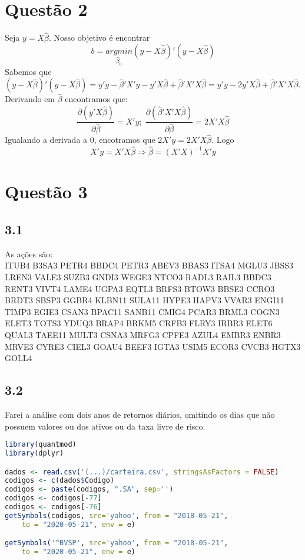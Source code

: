 \documentclass[12pt]{article}
\begin{document}
\section*{Questão 2}
Seja $y=X\hat{\beta}$. Nosso objetivo é encontrar
\begin{equation*}
b=\underset{\hat{\beta}_{0}}{argmin}(y-X\hat{\beta})'(y-X\hat{\beta})
\end{equation*}
Sabemos que $(y-X\hat{\beta})'(y-X\hat{\beta})=y'y-\hat{\beta}'X'y-
y'X\hat{\beta}+\hat{\beta}'X'X\hat{\beta}=y'y-2y'X\hat{\beta}+\hat{\beta}'X'X\hat{\beta}$. Derivando em $\hat{\beta}$ encontramos que:
\begin{equation*}
\frac{\partial (y'X\hat{\beta})}{\partial\hat{\beta}}=X'y; \; 
\frac{\partial (\hat{\beta}'X'X\hat{\beta})}{\partial\hat{\beta}}=2X'X\hat{\beta}
\end{equation*}
Igualando a derivada a 0, encotramos que $2X'y=2X'X\hat{\beta}$. Logo
\begin{equation*}
X'y=X'X\hat{\beta} \Longrightarrow \hat{\beta}=(X'X)^{-1}X'y
\end{equation*}

\section*{Questão 3}

\subsection*{3.1}
As ações são:\\
ITUB4
B3SA3
PETR4
BBDC4
PETR3
ABEV3
BBAS3
ITSA4
MGLU3
JBSS3
LREN3
VALE3
SUZB3
GNDI3
WEGE3
NTCO3
RADL3
RAIL3
BBDC3
RENT3
VIVT4
LAME4
UGPA3
EQTL3
BRFS3
BTOW3
BBSE3
CCRO3
BRDT3
SBSP3
GGBR4
KLBN11
SULA11
HYPE3
HAPV3
VVAR3
ENGI11
TIMP3
EGIE3
CSAN3
BPAC11
SANB11
CMIG4
PCAR3
BRML3
COGN3
ELET3
TOTS3
YDUQ3
BRAP4
BRKM5
CRFB3
FLRY3
IRBR3
ELET6
QUAL3
TAEE11
MULT3
CSNA3
MRFG3
CPFE3
AZUL4
EMBR3
ENBR3
MRVE3
CYRE3
CIEL3
GOAU4
BEEF3
IGTA3
USIM5
ECOR3
CVCB3
HGTX3
GOLL4

\subsection*{3.2}
Farei a análise com dois anos de retornos diários, omitindo os dias que não possuem valores ou dos ativos ou da taxa livre de risco.

\begin{lstlisting}[language=R]
library(quantmod)
library(dplyr)

dados <- read.csv('(...)/carteira.csv', stringsAsFactors = FALSE)
codigos <- c(dados$Codigo)
codigos <- paste(codigos, ".SA", sep='')
codigos <- codigos[-77]
codigos <- codigos[-76]
getSymbols(codigos, src='yahoo', from = "2018-05-21", 
	to = "2020-05-21", env = e)

getSymbols('^BVSP', src='yahoo', from = "2018-05-21", 
	to = "2020-05-21", env = e)
\end{lstlisting}
\end{document}
